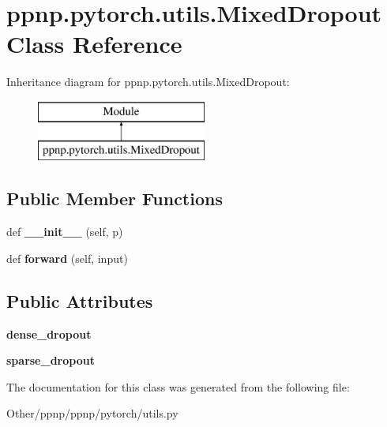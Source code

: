 \hypertarget{classppnp_1_1pytorch_1_1utils_1_1MixedDropout}{}\section{ppnp.\+pytorch.\+utils.\+Mixed\+Dropout Class Reference}
\label{classppnp_1_1pytorch_1_1utils_1_1MixedDropout}
Inheritance diagram for ppnp.\+pytorch.\+utils.\+Mixed\+Dropout\+:\begin{figure}[H]
\begin{center}
\leavevmode
\includegraphics[height=2.000000cm]{classppnp_1_1pytorch_1_1utils_1_1MixedDropout}
\end{center}
\end{figure}
\subsection*{Public Member Functions}
\begin{DoxyCompactItemize}
\item 
\mbox{\label{classppnp_1_1pytorch_1_1utils_1_1MixedDropout_a1481785211afed5ad256f56a2f050965}} 
def {\bfseries \+\_\+\+\_\+init\+\_\+\+\_\+} (self, p)
\item 
\mbox{\label{classppnp_1_1pytorch_1_1utils_1_1MixedDropout_ae5a1a8b1acc6fba6b72fce5357234e3d}} 
def {\bfseries forward} (self, input)
\end{DoxyCompactItemize}
\subsection*{Public Attributes}
\begin{DoxyCompactItemize}
\item 
\mbox{\label{classppnp_1_1pytorch_1_1utils_1_1MixedDropout_a404301121ed8132fe500ac24a10d689e}} 
{\bfseries dense\+\_\+dropout}
\item 
\mbox{\label{classppnp_1_1pytorch_1_1utils_1_1MixedDropout_a93db9fa2c0b9ea4bfb5bd92d57bf564f}} 
{\bfseries sparse\+\_\+dropout}
\end{DoxyCompactItemize}


The documentation for this class was generated from the following file\+:\begin{DoxyCompactItemize}
\item 
Other/ppnp/ppnp/pytorch/utils.\+py\end{DoxyCompactItemize}
